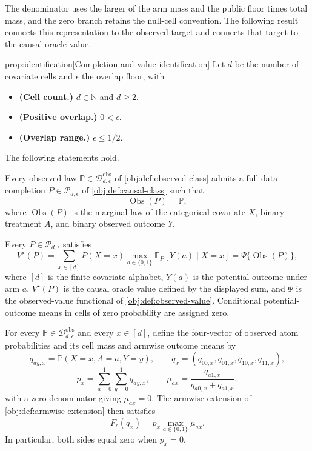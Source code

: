 The denominator uses the larger of the arm mass and the public floor times total mass, and the zero branch retains the null-cell convention. The following result connects this representation to the observed target and connects that target to the causal oracle value.

\begin{propositionv}{prop:identification}[Completion and value identification]
Let \(d\) be the number of covariate cells and \(\epsilon\) the overlap floor, with
\begin{itemize}
\item \textbf{(Cell count.)} \(d\in\mathbb N\) and \(d\ge 2\).
\item \textbf{(Positive overlap.)} \(0<\epsilon\).
\item \textbf{(Overlap range.)} \(\epsilon\le 1/2\).
\end{itemize}
The following statements hold.

Every observed law \(\mathbb P\in\mathcal D_{d,\epsilon}^{\mathrm{obs}}\) of \cref{obj:def:observed-class} admits a full-data completion \(P\in\mathcal P_{d,\epsilon}\) of \cref{obj:def:causal-class} such that
\[
\operatorname{Obs}(P)=\mathbb P,
\]
where \(\operatorname{Obs}(P)\) is the marginal law of the categorical covariate \(X\), binary treatment \(A\), and binary observed outcome \(Y\).

Every \(P\in\mathcal P_{d,\epsilon}\) satisfies
\[
V^\star(P)
=
\sum_{x\in[d]} P(X=x)
\max_{a\in\{0,1\}}
\mathbb E_P[Y(a)\mid X=x]
=
\Psi\{\operatorname{Obs}(P)\},
\]
where \([d]\) is the finite covariate alphabet, \(Y(a)\) is the potential outcome under arm \(a\), \(V^\star(P)\) is the causal oracle value defined by the displayed sum, and \(\Psi\) is the observed-value functional of \cref{obj:def:observed-value}. Conditional potential-outcome means in cells of zero probability are assigned zero.

For every \(\mathbb P\in\mathcal D_{d,\epsilon}^{\mathrm{obs}}\) and every \(x\in[d]\), define the four-vector of observed atom probabilities and its cell mass and armwise outcome means by
\[
q_{ay,x}=\mathbb P(X=x,A=a,Y=y),
\qquad
q_x=(q_{00,x},q_{01,x},q_{10,x},q_{11,x}),
\]
\[
p_x=\sum_{a=0}^{1}\sum_{y=0}^{1}q_{ay,x},
\qquad
\mu_{ax}=\frac{q_{a1,x}}{q_{a0,x}+q_{a1,x}},
\]
with a zero denominator giving \(\mu_{ax}=0\). The armwise extension of \cref{obj:def:armwise-extension} then satisfies
\[
F_\epsilon(q_x)=p_x\max_{a\in\{0,1\}}\mu_{ax}.
\]
In particular, both sides equal zero when \(p_x=0\).
\end{propositionv}


